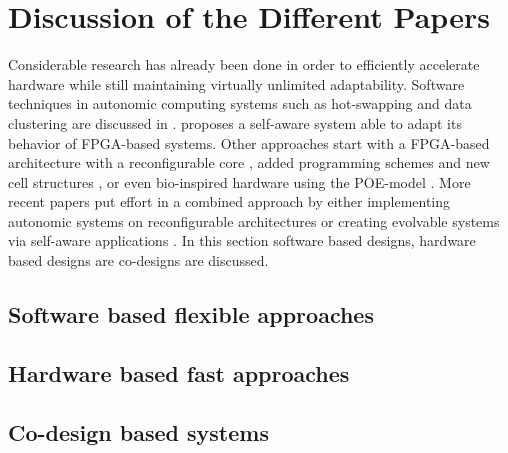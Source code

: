 
\section{Discussion of the Different Papers}
\label{sec:discussion}
Considerable research has already been done in order to efficiently accelerate hardware while still maintaining virtually unlimited adaptability. Software techniques in autonomic computing systems such as hot-swapping and data clustering are discussed in \cite{survey}. \cite{selfaware} proposes a self-aware system able to adapt its behavior of FPGA-based systems.
Other approaches start with a FPGA-based architecture with a reconfigurable core \cite{dpr},  added programming schemes and new cell structures \cite{virtex4}, \cite{erlangen} or even bio-inspired hardware using the POE-model \cite{poe}.
More recent papers put effort in a combined approach by either implementing autonomic systems on reconfigurable architectures \cite{reconfigurable} or creating evolvable systems via self-aware applications \cite{evolvable}. In this section software based designs, hardware based designs are co-designs are discussed. 

\subsection{Software based flexible approaches}
\label{sec:software}

%
\subsection{Hardware based fast approaches}
\label{sec:hardware}
%
%
\subsection{Co-design based systems}
\label{sec:codesign}
%


